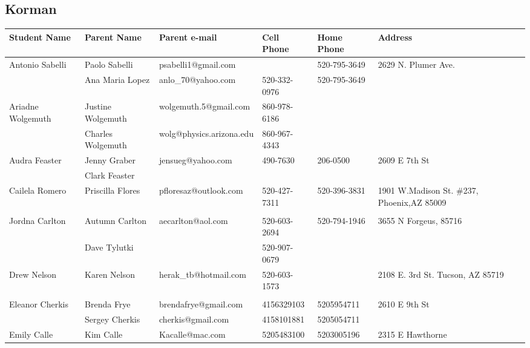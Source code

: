 \documentclass[landscape]{article}\usepackage[]{graphicx}\usepackage[]{color}
\begin{document}
\subsection{Korman}
\begin{longtable}{|p{100pt}|p{100pt}|p{140pt}|p{60pt}|p{64pt}|p{120pt}|}
\textbf{Student Name} & \textbf{Parent Name} & \textbf{Parent e-mail} & \textbf{Cell Phone} & \textbf{Home Phone} & \textbf{Address}\\
\hline
\hline
\multirow{2}{100pt}{Antonio Sabelli} & Paolo Sabelli & psabelli1@gmail.com &  & 520-795-3649 & \multirow{2}{120pt}{2629 N. Plumer Ave.} \\
 & Ana Maria Lopez & anlo\_70@yahoo.com & 520-332-0976 & 520-795-3649 & \\
\hline
\multirow{2}{100pt}{Ariadne Wolgemuth} & Justine Wolgemuth & wolgemuth.5@gmail.com & 860-978-6186 &  & \multirow{2}{120pt}{} \\
 & Charles Wolgemuth & wolg@physics.arizona.edu & 860-967-4343 &  & \\
\hline
\multirow{2}{100pt}{Audra Feaster} & Jenny Graber & jensueg@yahoo.com & 490-7630 & 206-0500 & \multirow{2}{120pt}{2609 E 7th St} \\
 & Clark Feaster &  &  &  & \\
\hline
\multirow{2}{100pt}{Cailela Romero} & Priscilla Flores & pfloresaz@outlook.com & 520-427-7311 & 520-396-3831 & \multirow{2}{120pt}{1901 W.Madison St. \#237,  Phoenix,AZ 85009} \\
 &  &  &  &  & \\
\hline
\multirow{2}{100pt}{Jordna Carlton} & Autumn Carlton & aecarlton@aol.com & 520-603-2694 & 520-794-1946 & \multirow{2}{120pt}{3655 N Forgeus, 85716} \\
 & Dave Tylutki &  & 520-907-0679 &  & \\
\hline
\multirow{2}{100pt}{Drew Nelson} & Karen Nelson & herak\_tb@hotmail.com & 520-603-1573 &  & \multirow{2}{120pt}{2108 E. 3rd St. Tucson, AZ 85719} \\
 &  &  &  &  & \\
\hline
\multirow{2}{100pt}{Eleanor Cherkis} & Brenda Frye & brendafrye@gmail.com & 4156329103 & 5205954711 & \multirow{2}{120pt}{2610 E 9th St} \\
 & Sergey Cherkis & cherkis@gmail.com & 4158101881 & 5205054711 & \\
\hline
\multirow{2}{100pt}{Emily Calle} & Kim Calle & Kacalle@mac.com & 5205483100 & 5203005196 & \multirow{2}{120pt}{2315 E Hawthorne} \\

\end{longtable}
\end{document}
